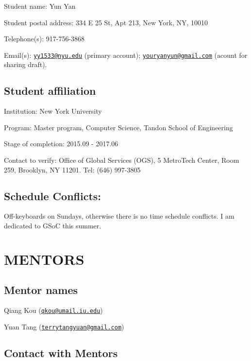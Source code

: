 \documentclass[]{article}
\begin{document}
Student name: Yun Yan

Student postal address: 334 E 25 St, Apt 213, New York, NY, 10010

Telephone(s): 917-756-3868

Email(s): \href{mailto:yy1533@nyu.edu}{\nolinkurl{yy1533@nyu.edu}}
(primary account);
\href{mailto:youryanyun@gmail.com}{\nolinkurl{youryanyun@gmail.com}}
(acount for sharing draft).

\subsection{Student affiliation}\label{student-affiliation}

Institution: New York University

Program: Master program, Computer Science, Tandon School of Engineering

Stage of completion: 2015.09 - 2017.06

Contact to verify: Office of Global Services (OGS), 5 MetroTech Center,
Room 259, Brooklyn, NY 11201. Tel: (646) 997-3805

\subsection{Schedule Conflicts:}\label{schedule-conflicts}

Off-keyboards on Sundays, otherwise there is no time schedule conflicts.
I am dedicated to GSoC this summer.

\section{MENTORS}\label{mentors}

\subsection{Mentor names}\label{mentor-names}

Qiang Kou
(\href{mailto:qkou@umail.iu.edu}{\nolinkurl{qkou@umail.iu.edu}})

Yuan Tang
(\href{mailto:terrytangyuan@gmail.com}{\nolinkurl{terrytangyuan@gmail.com}})

\subsection{Contact with Mentors}\label{contact-with-mentors}
\end{document}
